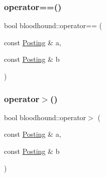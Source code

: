 \mbox{\label{namespacebloodhound_aa37ad87847e4da8983f626e6c5779c73}} 
\subsubsection{\texorpdfstring{operator==()}{operator==()}}
{\footnotesize\ttfamily bool bloodhound\+::operator== (\begin{DoxyParamCaption}\item[{const \hyperlink{structbloodhound_1_1Posting}{Posting} \&}]{a,  }\item[{const \hyperlink{structbloodhound_1_1Posting}{Posting} \&}]{b }\end{DoxyParamCaption})}

\mbox{\label{namespacebloodhound_a4a683ebe3ff767a829b87a89bade978c}} 
\subsubsection{\texorpdfstring{operator$>$()}{operator>()}}
{\footnotesize\ttfamily bool bloodhound\+::operator$>$ (\begin{DoxyParamCaption}\item[{const \hyperlink{structbloodhound_1_1Posting}{Posting} \&}]{a,  }\item[{const \hyperlink{structbloodhound_1_1Posting}{Posting} \&}]{b }\end{DoxyParamCaption})}


